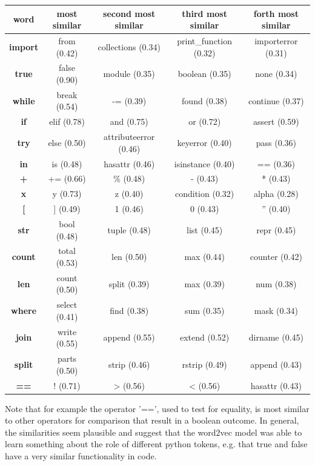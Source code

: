 \documentclass[
	a4paper,
	pagesize,
	pdftex,
	12pt,
	twoside, %
	BCOR=5mm, %
	ngerman,
	fleqn,
	final,
	]{scrartcl}
\begin{document}
\footnotesize
\begin{center}
	\begin{tabular}{ |c|c|c|c|c| } 
		\hline
		\textbf{word} & \textbf{ most similar} &\textbf{ second most similar} & \textbf{third most similar}& \textbf{forth most similar}\\ 
		\hline
		\textbf{import} & from (0.42) & collections (0.34) & print\_function (0.32) & importerror (0.31)\\ 
		\textbf{true} & false (0.90) & module (0.35) & boolean (0.35) & none (0.34)\\  
		\textbf{while} & break (0.54)  & -= (0.39) & found (0.38) & continue (0.37) \\
		\textbf{if} & elif (0.78)  & and (0.75) & or (0.72) & assert (0.59) \\
		\textbf{try} & else (0.50)  & attributeerror (0.46) & keyerror (0.40) & pass (0.36) \\
		\textbf{in} & is (0.48)  & hasattr (0.46) & isinstance (0.40) & == (0.36) \\
		\textbf{+} & += (0.66)  & \% (0.48) & - (0.43) & * (0.43) \\
		\textbf{x} & y (0.73)  & z (0.40) & condition (0.32) & alpha (0.28) \\
		\textbf{[} & ] (0.49)  & 1 (0.46) & 0 (0.43) & '' (0.40) \\
		\textbf{str} & bool (0.48)  & tuple (0.48) & list (0.45) & repr (0.45) \\
		\textbf{count} & total (0.53)  & len (0.50) & max (0.44) & counter (0.42) \\
		\textbf{len} & count (0.50)  & split (0.39) & max (0.39) & num (0.38) \\
		\textbf{where} & select (0.41)  & find (0.38) & sum (0.35) & mask (0.34) \\
		\textbf{join} & write (0.55)  & append (0.55) & extend (0.52) & dirname (0.45) \\
		\textbf{split} & parts (0.50)  & strip (0.46) & rstrip (0.49) & append (0.43) \\
		\textbf{==} & ! (0.71)  & > (0.56) & < (0.56) & hasattr (0.43) \\
		\hline
	\end{tabular}
\end{center}
\normalsize

Note that for example the operator '==', used to test for equality, is most similar to other operators for comparison that result in a boolean outcome. In general, the similarities seem plausible and suggest that the word2vec model was able to learn something about the role of different python tokens, e.g. that true and false have a very similar functionality in code.\\ 
\end{document}
